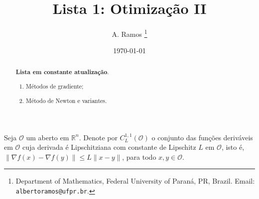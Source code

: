 \documentclass[a4paper,latin]{article}
\begin{document}
\title{Lista 1: Otimização II }

\author{
A. Ramos \thanks{Department of Mathematics,
    Federal University of Paraná, PR, Brazil.
    Email: {\tt albertoramos@ufpr.br}.}
}

\date{\today}
 
\maketitle

\begin{abstract}
{\bf Lista em constante atualização}.
 \begin{enumerate}
 \item Métodos de gradiente; 
 \item Método de Newton e variantes.
 \end{enumerate}
\end{abstract}

Seja $\mathcal{O}$ um aberto em $\mathbb{R}^{n}$. 
Denote por 
$C^{1,1}_{L}(\mathcal{O})$ o conjunto das funções deriváveis em $\mathcal{O}$ 
cuja derivada é Lipschitziana com constante de 
     Lipschitz $L$ em $\mathcal{O}$, isto é, 
     $\|\nabla f(x)-\nabla f(y)\|\leq L\|x-y\|$, 
     para todo $x,y \in \mathcal{O}$.
        
\end{document}
